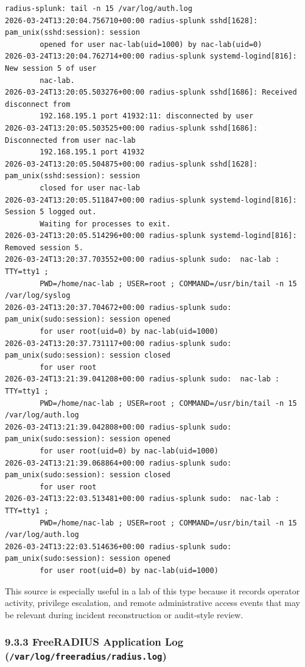 \documentclass[11pt]{article}
\begin{document}
\begin{verbatim}
radius-splunk: tail -n 15 /var/log/auth.log
2026-03-24T13:20:04.756710+00:00 radius-splunk sshd[1628]: pam_unix(sshd:session): session 
        opened for user nac-lab(uid=1000) by nac-lab(uid=0)
2026-03-24T13:20:04.762714+00:00 radius-splunk systemd-logind[816]: New session 5 of user 
        nac-lab.
2026-03-24T13:20:05.503276+00:00 radius-splunk sshd[1686]: Received disconnect from 
        192.168.195.1 port 41932:11: disconnected by user
2026-03-24T13:20:05.503525+00:00 radius-splunk sshd[1686]: Disconnected from user nac-lab 
        192.168.195.1 port 41932
2026-03-24T13:20:05.504875+00:00 radius-splunk sshd[1628]: pam_unix(sshd:session): session 
        closed for user nac-lab
2026-03-24T13:20:05.511847+00:00 radius-splunk systemd-logind[816]: Session 5 logged out. 
        Waiting for processes to exit.
2026-03-24T13:20:05.514296+00:00 radius-splunk systemd-logind[816]: Removed session 5.
2026-03-24T13:20:37.703552+00:00 radius-splunk sudo:  nac-lab : TTY=tty1 ; 
        PWD=/home/nac-lab ; USER=root ; COMMAND=/usr/bin/tail -n 15 /var/log/syslog
2026-03-24T13:20:37.704672+00:00 radius-splunk sudo: pam_unix(sudo:session): session opened 
        for user root(uid=0) by nac-lab(uid=1000)
2026-03-24T13:20:37.731117+00:00 radius-splunk sudo: pam_unix(sudo:session): session closed 
        for user root
2026-03-24T13:21:39.041208+00:00 radius-splunk sudo:  nac-lab : TTY=tty1 ; 
        PWD=/home/nac-lab ; USER=root ; COMMAND=/usr/bin/tail -n 15 /var/log/auth.log
2026-03-24T13:21:39.042808+00:00 radius-splunk sudo: pam_unix(sudo:session): session opened 
        for user root(uid=0) by nac-lab(uid=1000)
2026-03-24T13:21:39.068864+00:00 radius-splunk sudo: pam_unix(sudo:session): session closed 
        for user root
2026-03-24T13:22:03.513481+00:00 radius-splunk sudo:  nac-lab : TTY=tty1 ; 
        PWD=/home/nac-lab ; USER=root ; COMMAND=/usr/bin/tail -n 15 /var/log/auth.log
2026-03-24T13:22:03.514636+00:00 radius-splunk sudo: pam_unix(sudo:session): session opened 
        for user root(uid=0) by nac-lab(uid=1000)
\end{verbatim}

This source is especially useful in a lab of this type because it records operator activity, privilege escalation, and remote administrative access events that may be relevant during incident reconstruction or audit-style review.

\subsubsection{9.3.3 FreeRADIUS Application Log (\texttt{/var/log/freeradius/radius.log})}
\label{sec:freeradius-application-log-radius-log}
\end{document}
